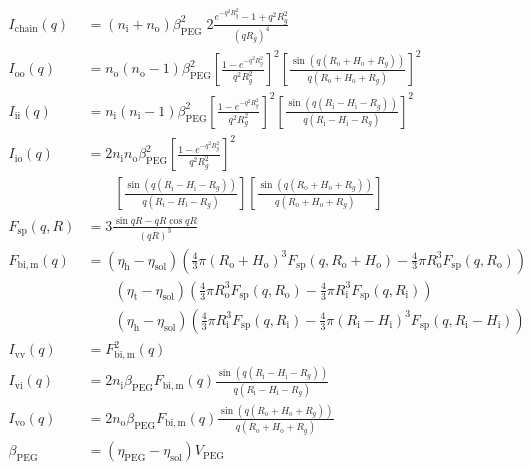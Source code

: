 \begin{align}
 I_\mathrm{chain}(q) &= (n_\mathrm{i}+n_\mathrm{o})\beta_\mathrm{PEG}^2 \; 2 \frac{e^{-q^2R_g^2}-1+q^2R_g^2}{(qR_g)^4} \label{eq:vesiclePEG7chain}\\
 I_\mathrm{oo}(q) &= n_\mathrm{o}(n_\mathrm{o}-1)\beta_\mathrm{PEG}^2 \left[\frac{1-e^{-q^2R_g^2}}{q^2R_g^2}\right]^2\left[\frac{\sin\left(q(R_\mathrm{o}+H_\mathrm{o}+R_g)\right)}{q(R_\mathrm{o}+H_\mathrm{o}+R_g)}\right]^2 \label{eq:vesiclePEG7oo}\\
 I_\mathrm{ii}(q) &=  n_\mathrm{i}(n_\mathrm{i}-1)\beta_\mathrm{PEG}^2 \left[\frac{1-e^{-q^2R_g^2}}{q^2R_g^2}\right]^2\left[\frac{\sin\left(q(R_\mathrm{i}-H_\mathrm{i}-R_g)\right)}{q(R_\mathrm{i}-H_\mathrm{i}-R_g)}\right]^2 \label{eq:vesiclePEG7ii}\\
  I_\mathrm{io}(q) &= 2 n_\mathrm{i}n_\mathrm{o}\beta_\mathrm{PEG}^2 \left[\frac{1-e^{-q^2R_g^2}}{q^2R_g^2}\right]^2 \nonumber \\
  &\qquad \left[\frac{\sin\left(q(R_\mathrm{i}-H_\mathrm{i}-R_g)\right)}{q(R_\mathrm{i}-H_\mathrm{i}-R_g)}\right] \left[\frac{\sin\left(q(R_\mathrm{o}+H_\mathrm{o}+R_g)\right)}{q(R_\mathrm{o}+H_\mathrm{o}+R_g)}\right]
 \label{eq:vesiclePEG7io}\\
 F_\mathrm{sp}(q,R) &= 3\frac{\sin qR - qR\cos qR}{(qR)^3}  \\
 F_\mathrm{bi,m}(q) &= (\eta_\mathrm{h}-\eta_\mathrm{sol})\left( \frac43\pi (R_\mathrm{o}+H_\mathrm{o})^3 F_\mathrm{sp}(q,R_\mathrm{o}+H_\mathrm{o}) -  \frac43\pi R_\mathrm{o}^3 F_\mathrm{sp}(q,R_\mathrm{o}) \right) \nonumber \\
 & \qquad (\eta_\mathrm{t}-\eta_\mathrm{sol}) \left(\frac43\pi R_\mathrm{o}^3 F_\mathrm{sp}(q,R_\mathrm{o}) - \frac43\pi R_\mathrm{i}^3 F_\mathrm{sp}(q,R_\mathrm{i}) \right) \\
 & \qquad (\eta_\mathrm{h}-\eta_\mathrm{sol}) \left(\frac43\pi R_\mathrm{i}^3 F_\mathrm{sp}(q,R_\mathrm{i}) - \frac43\pi (R_\mathrm{i}-H_\mathrm{i})^3 F_\mathrm{sp}(q,R_\mathrm{i}-H_\mathrm{i})\right) \nonumber \\
 I_\mathrm{vv}(q) &= F_\mathrm{bi,m}^2(q) \label{eq:vesiclePEG7vv} \\
 I_\mathrm{vi}(q) &= 2 n_\mathrm{i}\beta_\mathrm{PEG} F_\mathrm{bi,m}(q) \frac{\sin\left(q(R_\mathrm{i}-H_\mathrm{i}-R_g)\right)}{q(R_\mathrm{i}-H_\mathrm{i}-R_g)} \label{eq:vesiclePEG7vi} \\
 I_\mathrm{vo}(q) &= 2 n_\mathrm{o}\beta_\mathrm{PEG} F_\mathrm{bi,m}(q) \frac{\sin\left(q(R_\mathrm{o}+H_\mathrm{o}+R_g)\right)}{q(R_\mathrm{o}+H_\mathrm{o}+R_g)} \label{eq:vesiclePEG7vo} \\
 \beta_\mathrm{PEG} &= \left(\eta_\mathrm{PEG}-\eta_\mathrm{sol}\right) V_\mathrm{PEG}
\end{align}
